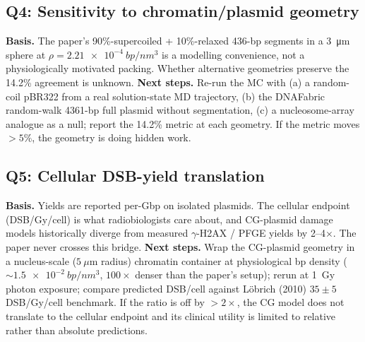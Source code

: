 \subsection*{Q4: Sensitivity to chromatin/plasmid geometry}
\textbf{Basis.} The paper's 90\%-supercoiled + 10\%-relaxed 436-bp
segments in a \SI{3}{\micro\meter} sphere at
$\rho = \SI{2.21e-4}{bp/nm^3}$ is a modelling convenience, not a
physiologically motivated packing. Whether alternative geometries
preserve the 14.2\% agreement is unknown.
\textbf{Next steps.} Re-run the MC with (a) a random-coil pBR322 from a
real solution-state MD trajectory, (b) the DNAFabric random-walk
4361-bp full plasmid without segmentation, (c) a nucleosome-array
analogue as a null; report the 14.2\% metric at each geometry.
If the metric moves $>5\%$, the geometry is doing hidden work.

\subsection*{Q5: Cellular DSB-yield translation}
\textbf{Basis.} Yields are reported per-Gbp on isolated plasmids. The
cellular endpoint (DSB/Gy/cell) is what radiobiologists care about, and
CG-plasmid damage models historically diverge from measured
$\gamma$-H2AX / PFGE yields by 2--4$\times$. The paper never crosses
this bridge.
\textbf{Next steps.} Wrap the CG-plasmid geometry in a nucleus-scale
($5~\mu$m radius) chromatin container at physiological bp density
($\sim\SI{1.5e-2}{bp/nm^3}$, $100\times$ denser than the paper's setup);
rerun at 1~Gy photon exposure; compare predicted DSB/cell against
L\"obrich (2010) $35\pm5$ DSB/Gy/cell benchmark. If the ratio is off by
$>2\times$, the CG model does not translate to the cellular endpoint
and its clinical utility is limited to relative rather than absolute
predictions.
